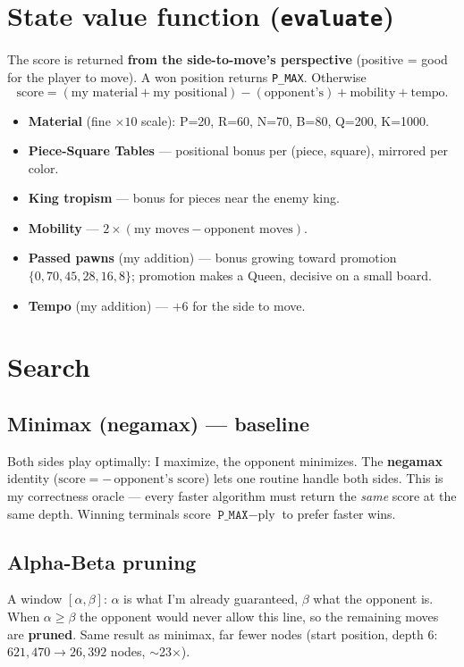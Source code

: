 \documentclass[11pt]{article}
\begin{document}
\section{State value function (\texttt{evaluate})}
The score is returned \textbf{from the side-to-move's perspective} (positive =
good for the player to move). A won position returns \texttt{P\_MAX}. Otherwise
\[
\text{score} = (\text{my material} + \text{my positional}) - (\text{opponent's})
              + \text{mobility} + \text{tempo}.
\]
\begin{itemize}[noitemsep]
  \item \textbf{Material} (fine $\times 10$ scale): P=20, R=60, N=70, B=80,
        Q=200, K=1000.
  \item \textbf{Piece-Square Tables} --- positional bonus per (piece, square),
        mirrored per color.
  \item \textbf{King tropism} --- bonus for pieces near the enemy king.
  \item \textbf{Mobility} --- $2\times(\text{my moves}-\text{opponent moves})$.
  \item \textbf{Passed pawns} (my addition) --- bonus growing toward promotion
        $\{0,70,45,28,16,8\}$; promotion makes a Queen, decisive on a small board.
  \item \textbf{Tempo} (my addition) --- $+6$ for the side to move.
\end{itemize}

\section{Search}

\subsection{Minimax (negamax) --- baseline}
Both sides play optimally: I maximize, the opponent minimizes. The
\textbf{negamax} identity ($\text{score}=-\,\text{opponent's score}$) lets one
routine handle both sides. This is my correctness oracle --- every faster
algorithm must return the \emph{same} score at the same depth. Winning terminals
score $\texttt{P\_MAX}-\text{ply}$ to prefer faster wins.

\subsection{Alpha-Beta pruning}
A window $[\alpha,\beta]$: $\alpha$ is what I'm already guaranteed, $\beta$ what
the opponent is. When $\alpha\ge\beta$ the opponent would never allow this line,
so the remaining moves are \textbf{pruned}. Same result as minimax, far fewer
nodes (start position, depth 6: $621{,}470 \to 26{,}392$ nodes, $\sim$23$\times$).
\end{document}
